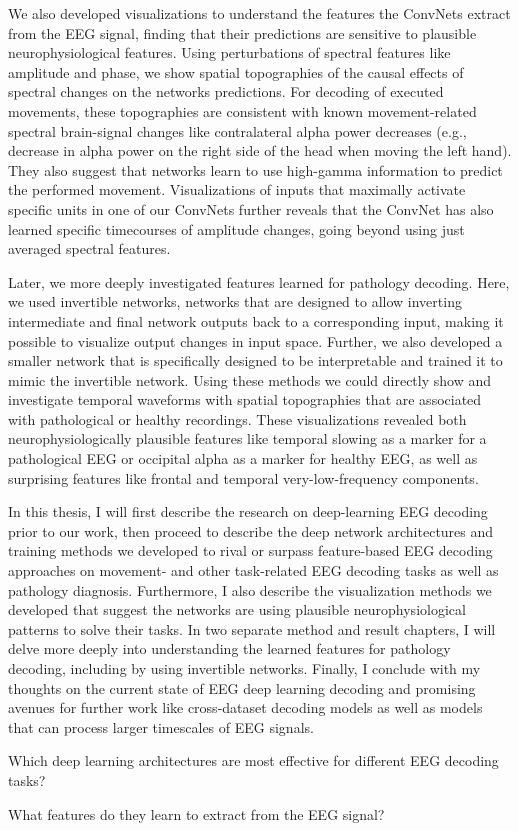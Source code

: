 We also developed visualizations to understand the features the ConvNets
extract from the EEG signal, finding that their predictions are
sensitive to plausible neurophysiological features. Using perturbations
of spectral features like amplitude and phase, we show spatial topographies of the causal effects of spectral changes on the networks predictions. For decoding of executed movements, these topographies are consistent with known movement-related spectral brain-signal changes like contralateral alpha power decreases (e.g., decrease in alpha power on the right side of the head when moving the left hand). They also suggest that networks learn to use high-gamma information to predict the performed movement. Visualizations of inputs that maximally activate specific units in one of our ConvNets further reveals that the ConvNet has also learned
specific timecourses of amplitude changes, going beyond using just
averaged spectral features.

Later, we more deeply investigated features learned for pathology
decoding. Here, we used invertible networks, networks that are
designed to allow inverting intermediate and final network outputs
back to a corresponding input, making it possible to visualize output changes in input space. Further, we also developed a smaller network that is specifically designed to be interpretable and trained it to mimic the
invertible network. Using these methods we could directly show and
investigate temporal waveforms with spatial topographies that are
associated with pathological or healthy recordings. These visualizations
revealed both neurophysiologically plausible features like temporal
slowing as a marker for a pathological EEG or occipital alpha as a
marker for healthy EEG, as well as surprising features like frontal and
temporal very-low-frequency components.

In this thesis, I will first describe the research on deep-learning EEG
decoding prior to our work, then proceed to describe the deep network
architectures and training methods we developed to rival or surpass
feature-based EEG decoding approaches on movement- and other
task-related EEG decoding tasks as well as pathology diagnosis.
Furthermore, I also describe the visualization methods we developed that
suggest the networks are using plausible neurophysiological patterns to
solve their tasks. In two separate method and result chapters, I will
delve more deeply into understanding the learned features for pathology
decoding, including by using invertible networks. Finally, I conclude
with my thoughts on the current state of EEG deep learning decoding and
promising avenues for further work like cross-dataset decoding models as
well as models that can process larger timescales of EEG signals.

\begin{openbox}
\item Which deep learning architectures are most effective for different EEG decoding tasks?
\item What features do they learn to extract from the EEG signal?
\end{openbox}
